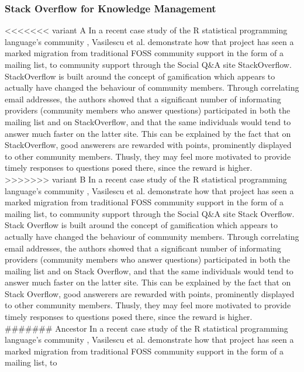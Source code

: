 \documentclass[a4paper,11pt]{article} %
\begin{document}
\subsubsection{Stack Overflow for Knowledge Management}
<<<<<<< variant A
In a recent case study of the R statistical programming language's community
\cite{Vasilescu14StackOverflow}, Vasilescu et al. demonstrate how that
project has seen a marked migration from traditional FOSS community support
in the form of a mailing list, to community support through the Social
Q\&{}A site StackOverflow. StackOverflow is built around the concept of
gamification\cite{deterding2011game} which appears to actually have changed
the behaviour of community members. Through correlating email addresses, the
authors showed that a significant number of informating providers (community
members who answer questions) participated in both the mailing list and on
StackOverflow, and that the same individuals would tend to answer much
faster on the latter site. This can be explained by the fact that on
StackOverflow, good answerers are rewarded with points, prominently
displayed to other community members. Thusly, they may feel more motivated
to provide timely responses to questions posed there, since the reward is
higher.
>>>>>>> variant B
In a recent case study of the R statistical programming language's
community \cite{Vasilescu14StackOverflow}, Vasilescu et
al. demonstrate how that project has seen a marked migration from
traditional FOSS community support in the form of a mailing list, to
community support through the Social Q\&{}A site
Stack Overflow. Stack Overflow is built around the concept of
gamification\cite{deterding2011game} which appears to actually have
changed the behaviour of community members. Through correlating email
addresses, the authors showed that a significant number of informating
providers (community members who answer questions) participated in
both the mailing list and on Stack Overflow, and that the same
individuals would tend to answer much faster on the latter site. This
can be explained by the fact that on Stack Overflow, good answerers are
rewarded with points, prominently displayed to other community
members. Thusly, they may feel more motivated to provide timely
responses to questions posed there, since the reward is higher.
####### Ancestor
In a recent case study of the R statistical programming language's
community \cite{Vasilescu14StackOverflow}, Vasilescu et
al. demonstrate how that project has seen a marked migration from
traditional FOSS community support in the form of a mailing list, to
\end{document}
